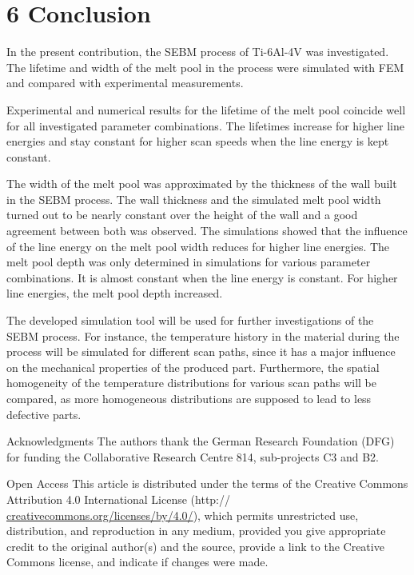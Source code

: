 \documentclass[10pt]{article}
\begin{document}
\section*{6 Conclusion}
In the present contribution, the SEBM process of Ti-6Al-4V was investigated. The lifetime and width of the melt pool in the process were simulated with FEM and compared with experimental measurements.

Experimental and numerical results for the lifetime of the melt pool coincide well for all investigated parameter combinations. The lifetimes increase for higher line energies and stay constant for higher scan speeds when the line energy is kept constant.

The width of the melt pool was approximated by the thickness of the wall built in the SEBM process. The wall thickness and the simulated melt pool width turned out to be nearly constant over the height of the wall and a good agreement between both was observed. The simulations showed that the influence of the line energy on the melt pool width reduces for higher line energies. The melt pool depth was only determined in simulations for various parameter combinations. It is almost constant when the line energy is constant. For higher line energies, the melt pool depth increased.

The developed simulation tool will be used for further investigations of the SEBM process. For instance, the temperature history in the material during the process will be simulated for different scan paths, since it has a major influence on the mechanical properties of the produced part. Furthermore, the spatial homogeneity of the temperature distributions for various scan paths will be compared, as more homogeneous distributions are supposed to lead to less defective parts.

Acknowledgments The authors thank the German Research Foundation (DFG) for funding the Collaborative Research Centre 814, sub-projects $\mathrm{C} 3$ and B2.

Open Access This article is distributed under the terms of the Creative Commons Attribution 4.0 International License (http:// \href{http://creativecommons.org/licenses/by/4.0/}{creativecommons.org/licenses/by/4.0/}), which permits unrestricted use, distribution, and reproduction in any medium, provided you give appropriate credit to the original author(s) and the source, provide a link to the Creative Commons license, and indicate if changes were made.
\end{document}
